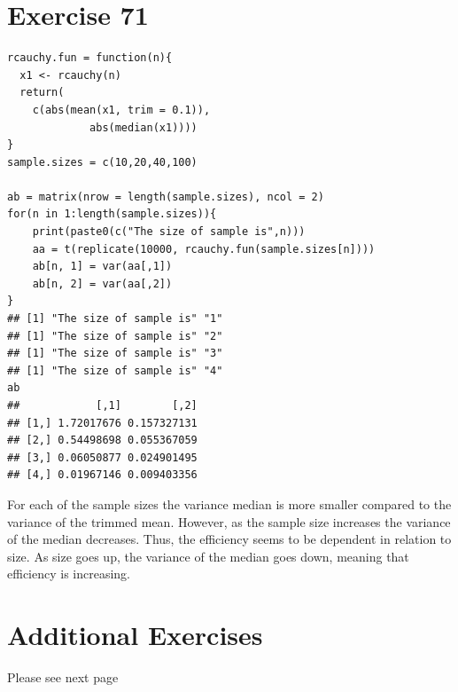 \documentclass{article}\usepackage[]{graphicx}\usepackage[]{color}
\makeatletter
\newenvironment{kframe}{%
 \def\at@end@of@kframe{}%
 \ifinner\ifhmode%
  \def\at@end@of@kframe{\end{minipage}}%
  \begin{minipage}{\columnwidth}%
 \fi\fi%
 \def\FrameCommand##1{\hskip\@totalleftmargin \hskip-\fboxsep
 \colorbox{shadecolor}{##1}\hskip-\fboxsep
     \hskip-\linewidth \hskip-\@totalleftmargin \hskip\columnwidth}%
 \MakeFramed {\advance\hsize-\width
   \@totalleftmargin\z@ \linewidth\hsize
   \@setminipage}}%
 {\par\unskip\endMakeFramed%
 \at@end@of@kframe}
\newenvironment{knitrout}{}{} %
\makeatother
\begin{document}
\section*{Exercise 71}
\begin{knitrout}
\color{fgcolor}\begin{kframe}
\begin{verbatim}
rcauchy.fun = function(n){
  x1 <- rcauchy(n)
  return(
    c(abs(mean(x1, trim = 0.1)),
             abs(median(x1))))
}
sample.sizes = c(10,20,40,100)

ab = matrix(nrow = length(sample.sizes), ncol = 2)
for(n in 1:length(sample.sizes)){
    print(paste0(c("The size of sample is",n)))
    aa = t(replicate(10000, rcauchy.fun(sample.sizes[n])))
    ab[n, 1] = var(aa[,1])
    ab[n, 2] = var(aa[,2])
}
## [1] "The size of sample is" "1"                    
## [1] "The size of sample is" "2"                    
## [1] "The size of sample is" "3"                    
## [1] "The size of sample is" "4"
ab
##            [,1]        [,2]
## [1,] 1.72017676 0.157327131
## [2,] 0.54498698 0.055367059
## [3,] 0.06050877 0.024901495
## [4,] 0.01967146 0.009403356
\end{verbatim}
\end{kframe}
\end{knitrout}
For each of the sample sizes the variance median is more smaller compared to the variance of the trimmed mean. However, as the sample size increases the variance of the median decreases. Thus, the efficiency seems to be dependent in relation to size. As size goes up, the variance of the median goes down, meaning that efficiency is increasing.

\section*{Additional Exercises}
Please see next page
\end{document}
